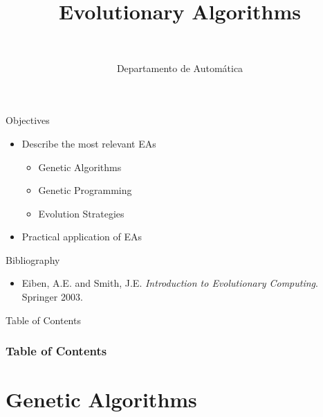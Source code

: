 \documentclass[10pt,compress]{beamer} %
\title[Evolutionary Algorithms]{Evolutionary Algorithms}
\author{\asignatura\\\carrera}
\institute{}
\date{Departamento de Automática}
\begin{document}
{\titlepageBlue
    \begin{frame}
        \titlepage
    \end{frame}
}

\institute{\asignatura}

\begin{frame}[plain]{}
   \begin{block}{Objectives}
       \begin{itemize}
            \item Describe the most relevant EAs
            \begin{itemize}
                \item Genetic Algorithms
                \item Genetic Programming
                \item Evolution Strategies
            \end{itemize}
            \item Practical application of EAs
       \end{itemize}
   \end{block}

   \begin{block}{Bibliography}
    \begin{itemize}
         \item Eiben, A.E. and Smith, J.E. \emph{Introduction to Evolutionary Computing}. Springer 2003.
	\end{itemize}
   \end{block}
\end{frame}

{
\begin{frame}[shrink]{Table of Contents}
 \frametitle{Table of Contents}

    \begin{multicols}{2}
    \tableofcontents
    \end{multicols}
\end{frame}
}

\section{Genetic Algorithms}
\end{document}
